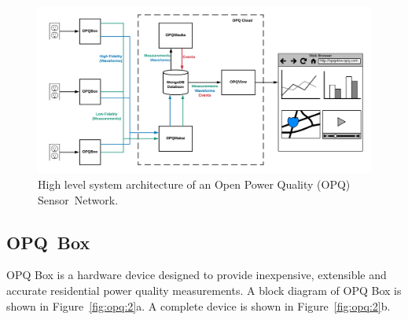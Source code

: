 \documentclass[energies,article,accept,moreauthors,pdftex]{Definitions/mdpi}
\begin{document}
\begin{figure}[H]
\center \includegraphics[width=5in]{images/architecture/system-diagram.png}
\caption{High level system architecture of an Open Power Quality (OPQ) Sensor~Network.}
\label{fig:architecture}
\end{figure}


\subsection{OPQ~Box}
\label{sec:opq-box}

OPQ Box is a hardware device designed to provide inexpensive, extensible and accurate residential power quality measurements.
A block diagram of OPQ Box is shown in Figure~\ref{fig:opq:2}a.
A complete device is shown in Figure~\ref{fig:opq:2}b.
\end{document}
